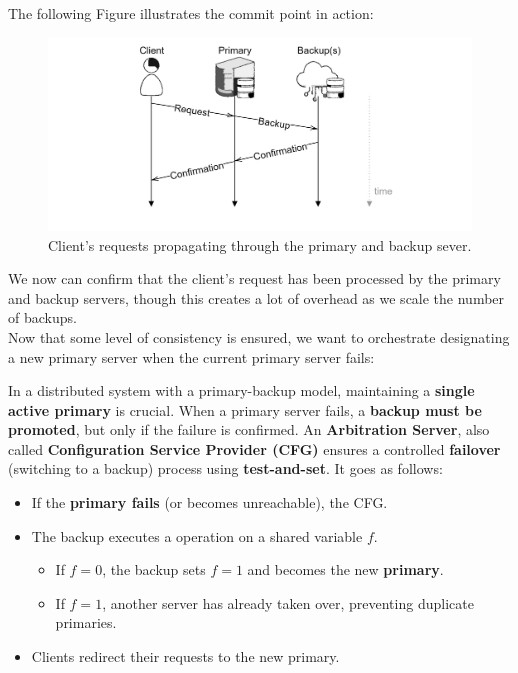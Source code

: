 \newpage 

\noindent
The following Figure illustrates the commit point in action:
\begin{figure}[h]
    
    \hspace{1em}
    \includegraphics[width=1\textwidth]{Sections/rep/commit.png}
    \caption{Client's requests propagating through the primary and backup sever.}
\end{figure}

\noindent
We now can confirm that the client's request has been processed by the primary and backup servers, though this creates a lot of overhead as we scale the number of backups.\\

\noindent
Now that some level of consistency is ensured, we want to orchestrate designating a new primary server when the current primary server fails:

\begin{Def}

    In a distributed system with a primary-backup model, maintaining a \textbf{single active primary} is crucial. When a primary server fails, a \textbf{backup must be promoted}, 
    but only if the failure is confirmed. An \textbf{Arbitration Server}, also called \textbf{Configuration Service Provider (CFG)} ensures a controlled \textbf{failover} (switching to a backup)
    process using \textbf{test-and-set}. It goes as follows:
    
    \begin{itemize}
        \item If the \textbf{primary fails} (or becomes unreachable), the CFG.
        \item The backup executes a  operation on a shared variable \( f \).
        \begin{itemize}
            \item If \( f = 0 \), the backup sets \( f = 1 \) and becomes the new \textbf{primary}.
            \item If \( f = 1 \), another server has already taken over, preventing duplicate primaries.
        \end{itemize}
        \item Clients redirect their requests to the new primary.
    \end{itemize}
    \end{Def}
    
